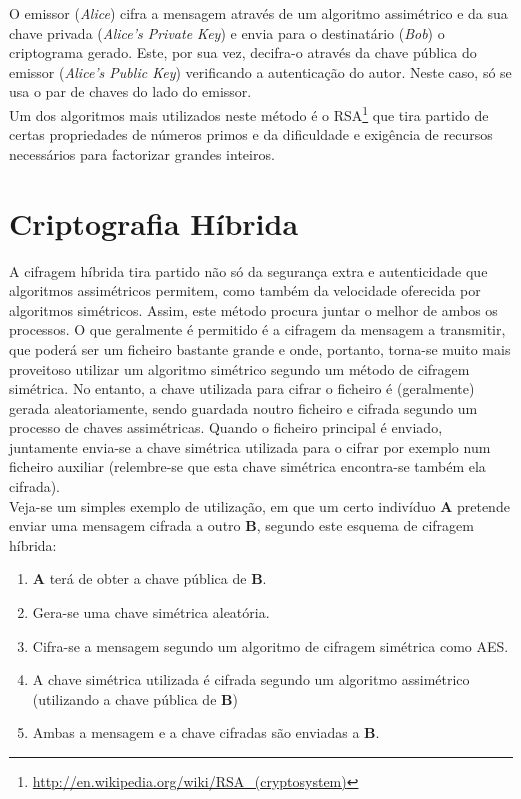 \documentclass[a4paper,11pt,openright,oneside]{report}
\begin{document}
O emissor (\textit{Alice}) cifra a mensagem através de um algoritmo assimétrico e da sua chave privada (\textit{Alice’s Private Key}) e envia para o destinatário (\textit{Bob}) o criptograma gerado. Este, por sua vez, decifra-o através da chave pública do emissor (\textit{Alice’s Public Key}) verificando a autenticação do autor. Neste caso, só se usa o par de chaves do lado do emissor.\\

Um dos algoritmos mais utilizados neste método é o RSA\footnote{\url{http://en.wikipedia.org/wiki/RSA_(cryptosystem)}} que tira partido de certas propriedades de números primos e da dificuldade e exigência de recursos necessários para factorizar grandes inteiros.

\section{Criptografia Híbrida}
\label{chap.híbrida}

A cifragem híbrida tira partido não só da segurança extra e autenticidade que algoritmos assimétricos permitem, como também da velocidade oferecida por algoritmos simétricos. Assim, este método procura juntar o melhor de ambos os processos. O que geralmente é permitido é a cifragem da mensagem a transmitir, que poderá ser um ficheiro bastante grande e onde, portanto, torna-se muito mais proveitoso utilizar um algoritmo simétrico segundo um método de cifragem simétrica. No entanto, a chave utilizada para cifrar o ficheiro é (geralmente) gerada aleatoriamente, sendo guardada noutro ficheiro e cifrada segundo um processo de chaves assimétricas. Quando o ficheiro principal é enviado, juntamente envia-se a chave simétrica utilizada para o cifrar por exemplo num ficheiro auxiliar (relembre-se que esta chave simétrica encontra-se também ela cifrada).\\

Veja-se um simples exemplo de utilização, em que um certo indivíduo \textbf{A} pretende enviar uma mensagem cifrada a outro \textbf{B}, segundo este esquema de cifragem híbrida:

\begin{enumerate}
\item \textbf{A} terá de obter a chave pública de \textbf{B}.
\item Gera-se uma chave simétrica aleatória.
\item Cifra-se a mensagem segundo um algoritmo de cifragem simétrica como AES.
\item A chave simétrica utilizada é cifrada segundo um algoritmo assimétrico (utilizando a chave pública de \textbf{B})
\item Ambas a mensagem e a chave cifradas são enviadas a \textbf{B}.
\end{enumerate}
\end{document}
